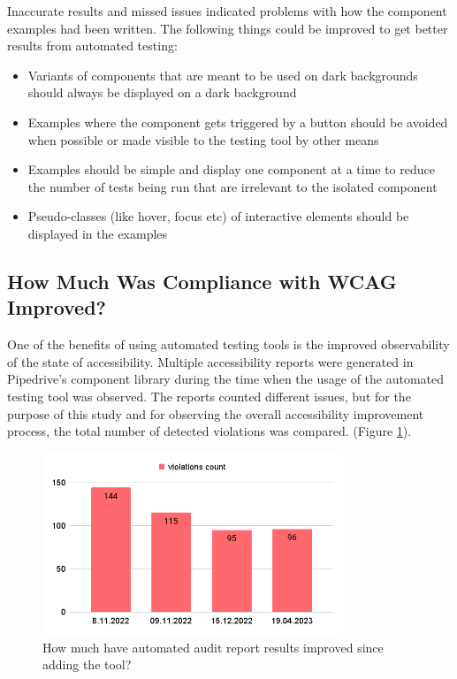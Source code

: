 \documentclass{master_thesis}
\begin{document}
Inaccurate results and missed issues indicated problems with how the component examples had been written. The following things could be improved to get better results from automated testing:
\begin{itemize}
	\item Variants of components that are meant to be used on dark backgrounds should always be displayed on a dark background
	\item Examples where the component gets triggered by a button should be avoided when possible or made visible to the testing tool by other means
	\item Examples should be simple and display one component at a time to reduce the number of tests being run that are irrelevant to the isolated component
	\item Pseudo-classes (like hover, focus etc) of interactive elements should be displayed in the examples
\end{itemize}

\subsection{How Much Was Compliance with WCAG Improved?}

One of the benefits of using automated testing tools is the improved observability of the state of accessibility.
Multiple accessibility reports were generated in Pipedrive's component library during the time when the usage of the automated testing tool was observed. The reports counted different
issues, but for the purpose of this study and for observing the overall accessibility improvement process, the total number of detected violations was compared. (Figure \ref{fig:automted-reports}).

\begin{figure}[ht]
	\centering
	\includegraphics[width=0.8\textwidth]{img/automated-audit-reports.png}
	\caption[Automated audit results improvements]{How much have automated audit report results improved since adding the tool?}
	\label{fig:automted-reports}
\end{figure}
\end{document}
